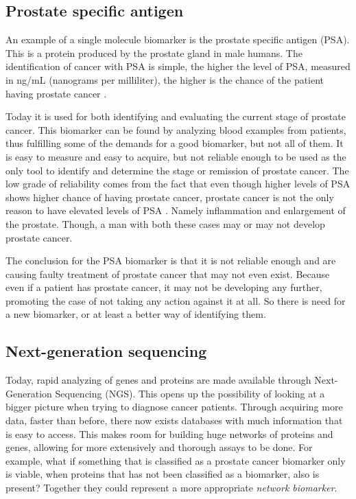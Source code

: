 \documentclass[UKenglish,11pt,a4paper]{article}
\begin{document}
\subsection{Prostate specific antigen}
An example of a single molecule biomarker is the prostate specific antigen (PSA). This is a protein produced by the 
prostate gland in male humans. The identification of cancer with PSA is simple, the higher the level of PSA, measured in
ng/mL (nanograms per milliliter), the higher is the chance of the patient having prostate cancer \cite{cancerfacts}.

Today it is used for both identifying and
evaluating the current stage of prostate cancer. This biomarker can be found by analyzing blood examples from patients,
thus fulfilling some of the demands for a good biomarker, %
but not all of them. It is easy to measure and easy to acquire, but not reliable enough to be used as the only tool
to identify and determine the stage or remission of prostate cancer. The low grade of reliability comes from the fact
that even though higher levels of PSA shows higher chance of having prostate cancer, prostate cancer is not the only
reason to have elevated levels of PSA \cite{cancerfacts}.
Namely inflammation and enlargement of the prostate. Though, a man with both these cases may or may not develop prostate
cancer.

The conclusion for the PSA biomarker is that it is not reliable enough and are causing faulty treatment of prostate
cancer that may not even exist. Because even if a patient has prostate cancer, it may not be developing any further, 
promoting the case of not taking any action against it at all. So there is need for a new biomarker, or at least a 
better way of identifying them.

\subsection{Next-generation sequencing}
Today, rapid analyzing of genes and proteins are made available through Next-Generation Sequencing (NGS)\cite{ngs1}.
This opens up the possibility of looking at a bigger picture when trying to diagnose cancer patients. Through acquiring
more data, faster than before, there now exists databases with much information that is easy to access. This makes room
for building huge networks of proteins and genes, allowing for more extensively and thorough assays to be done. For
example, what if something that is classified as a prostate cancer biomarker only is viable, when proteins that has not
been classified as a biomarker, also is present? Together they could represent a more appropriate
\emph{network biomarker}.
\end{document}
